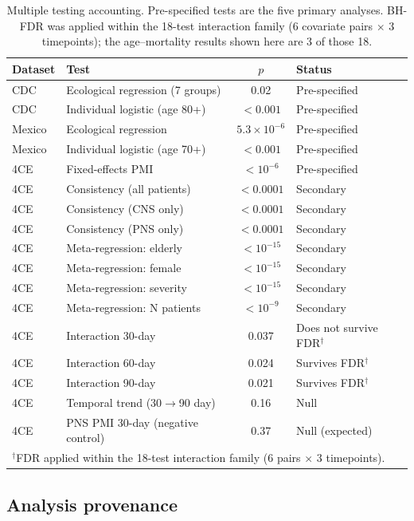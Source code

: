\documentclass[11pt]{article}
\begin{document}
\begin{table}[t]
\centering
\caption{Multiple testing accounting.  Pre-specified tests are the five
primary analyses.  BH-FDR was applied within the 18-test interaction
family (6 covariate pairs $\times$ 3 timepoints); the age--mortality
results shown here are 3 of those 18.}
\label{tab:multiplicity}
\small
\begin{tabular}{llcl}
\toprule
Dataset & Test & $p$ & Status \\
\midrule
CDC & Ecological regression (7 groups) & 0.02 & Pre-specified \\
CDC & Individual logistic (age 80+) & $< 0.001$ & Pre-specified \\
Mexico & Ecological regression & $5.3 \times 10^{-6}$ & Pre-specified \\
Mexico & Individual logistic (age 70+) & $< 0.001$ & Pre-specified \\
4CE & Fixed-effects PMI & $< 10^{-6}$ & Pre-specified \\
\midrule
4CE & Consistency (all patients) & $< 0.0001$ & Secondary \\
4CE & Consistency (CNS only) & $< 0.0001$ & Secondary \\
4CE & Consistency (PNS only) & $< 0.0001$ & Secondary \\
4CE & Meta-regression: elderly & $< 10^{-15}$ & Secondary \\
4CE & Meta-regression: female & $< 10^{-15}$ & Secondary \\
4CE & Meta-regression: severity & $< 10^{-15}$ & Secondary \\
4CE & Meta-regression: N patients & $< 10^{-9}$ & Secondary \\
4CE & Interaction 30-day & 0.037 & Does not survive FDR$^\dagger$ \\
4CE & Interaction 60-day & 0.024 & Survives FDR$^\dagger$ \\
4CE & Interaction 90-day & 0.021 & Survives FDR$^\dagger$ \\
4CE & Temporal trend (30$\to$90 day) & 0.16 & Null \\
4CE & PNS PMI 30-day (negative control) & 0.37 & Null (expected) \\
\bottomrule
\multicolumn{4}{l}{\footnotesize $^\dagger$FDR applied within the
18-test interaction family (6 pairs $\times$ 3 timepoints).}
\end{tabular}
\end{table}

\subsection{Analysis provenance}
\end{document}
